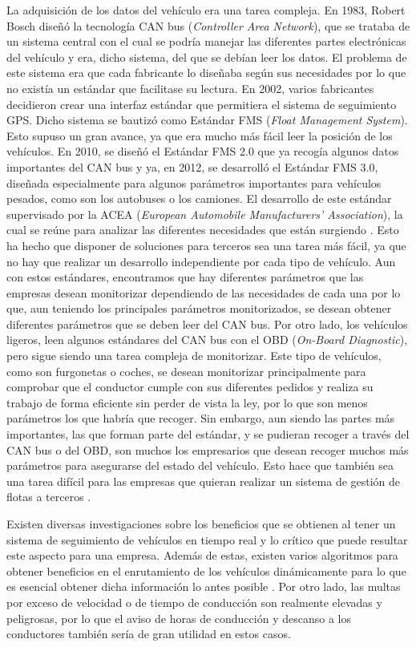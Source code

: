 La adquisición de los datos del vehículo era una tarea compleja. En 1983, Robert Bosch diseñó la tecnología CAN bus (\emph{Controller Area Network}), que se trataba de un sistema central con el cual se podría manejar las diferentes partes electrónicas del vehículo y era, dicho sistema, del que se debían leer los datos. El problema de este sistema era que cada fabricante lo diseñaba según sus necesidades por lo que no existía un estándar que facilitase su lectura. En 2002, varios fabricantes decidieron crear una interfaz estándar que permitiera el sistema de seguimiento GPS. Dicho sistema se bautizó como Estándar FMS (\emph{Float Management System}). Esto supuso un gran avance, ya que era mucho más fácil leer la posición de los vehículos. En 2010, se diseñó el Estándar FMS 2.0 que ya recogía algunos datos importantes del CAN bus y ya, en 2012, se desarrolló el Estándar FMS 3.0, diseñada especialmente para algunos parámetros importantes para vehículos pesados, como son los autobuses o los camiones. El desarrollo de este estándar supervisado por la ACEA (\emph{European Automobile Manufacturers’ Association}), la cual se reúne para analizar las diferentes necesidades que están surgiendo \cite{2-1}. Esto ha hecho que disponer de soluciones para terceros sea una tarea más fácil, ya que no hay que realizar un desarrollo independiente por cada tipo de vehículo. Aun con estos estándares, encontramos que hay diferentes parámetros que las empresas desean monitorizar dependiendo de las necesidades de cada una por lo que, aun teniendo los principales parámetros monitorizados, se desean obtener diferentes parámetros que se deben leer del CAN bus. Por otro lado, los vehículos ligeros, leen algunos estándares del CAN bus con el OBD (\emph{On-Board Diagnostic}), pero sigue siendo una tarea compleja de monitorizar. Este tipo de vehículos, como son furgonetas o coches, se desean monitorizar principalmente para comprobar que el conductor cumple con sus diferentes pedidos y realiza su trabajo de forma eficiente sin perder de vista la ley, por lo que son menos parámetros los que habría que recoger. Sin embargo, aun siendo las partes más importantes, las que forman parte del estándar, y se pudieran recoger a través del CAN bus o del OBD, son muchos los empresarios que desean recoger muchos más parámetros para asegurarse del estado del vehículo. Esto hace que también sea una tarea difícil para las empresas que quieran realizar un sistema de gestión de flotas a terceros \cite{2-2}.

Existen diversas investigaciones sobre los beneficios que se obtienen al tener un sistema de seguimiento de vehículos en tiempo real y lo crítico que puede resultar este aspecto para una empresa. Además de estas, existen varios algoritmos para obtener beneficios en el enrutamiento de los vehículos dinámicamente para lo que es esencial obtener dicha información lo antes posible \cite{1-1-4}. Por otro lado, las multas por exceso de velocidad \cite{1-1-5} o de tiempo de conducción \cite{1-1-6} son realmente elevadas y peligrosas, por lo que el aviso de horas de conducción y descanso a los conductores también sería de gran utilidad en estos casos.

